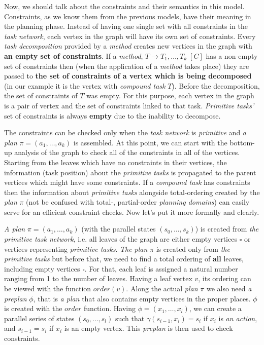 \medskip\noindent
Now, we should talk about the constraints and their semantics in this model. Constraints, as we know them from the previous models, have their meaning in the planning phase. Instead of having one single set with all constraints in the \emph{task network}, each vertex in the graph will have its own set of constraints. Every \emph{task decomposition} provided by a \emph{method} creates new vertices in the graph with \textbf{an empty set of constraints}. If a \emph{method}, $T \rightarrow T_1, \dots, T_k \; [C]$ has a non-empty set of constraints then (when the application of a \emph{method} takes place) they are passed to \textbf{the set of constraints of a vertex which is being decomposed} (in our example it is the vertex with \emph{compound task} $T$). Before the decomposition, the set of constraints of $T$ was empty. For this purpose, each vertex in the graph is a pair of vertex and the set of constraints linked to that task. \emph{Primitive tasks'} set of constraints is always \textbf{empty} due to the inability to decompose.

\medskip\noindent
The constraints can be checked only when the \emph{task network} is \emph{primitive} and \emph{a plan} $\pi = (a_1, \dots, a_k)$ is assembled. At this point, we can start with the bottom-up analysis of the graph to check all of the constraints in all of the vertices. Starting from the leaves which have no constraints in their vertices, the information (task position) about the \emph{primitive tasks} is propagated to the parent vertices which might have some constraints. If a \emph{compound task} has constraints then the information about \emph{primitive tasks} alongside total-ordering created by the \emph{plan} $\pi$ (not be confused with total-, partial-order \emph{planning domains}) can easily serve for an efficient constraint checks. Now let's put it more formally and clearly.

\medskip\noindent
\emph{A plan} $\pi = (a_1, \dots, a_k)$ (with the parallel states $(s_0, \dots, s_k)$) is created from \emph{the primitive task network}, i.e. all leaves of the graph are either empty vertices $\square$ or vertices representing \emph{primitive tasks}. \emph{The plan} $\pi$ is created only from \emph{the primitive tasks} but before that, we need to find a total ordering of \textbf{all} leaves, including empty vertices $\square$. For that, each leaf is assigned a natural number ranging from 1 to the number of leaves. Having a leaf vertex $v$, its ordering can be viewed with the function $order(v)$. Along the actual \emph{plan} $\pi$ we also need \emph{a preplan} $\phi$, that is \emph{a plan} that also contains empty vertices in the proper places. $\phi$ is created with the $order$ function. Having $\phi = (x_1, \dots, x_l)$, we can create a parallel series of states $(s_0, \dots, s_l)$ such that $\gamma(s_{i-1}, x_i) = s_i$ if $x_i$ is \emph{an action}, and $s_{i-1} = s_i$ if $x_i$ is an empty vertex. This \emph{preplan} is then used to check constraints.

